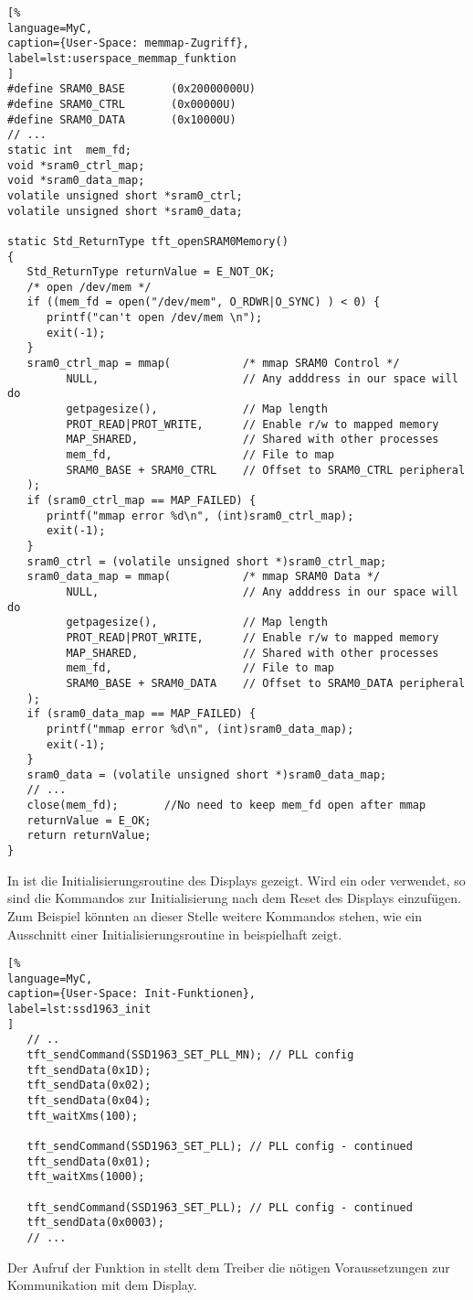 \begin{lstlisting}[%
language=MyC,
caption={User-Space: memmap-Zugriff},
label=lst:userspace_memmap_funktion
]
#define SRAM0_BASE       (0x20000000U)
#define SRAM0_CTRL       (0x00000U)
#define SRAM0_DATA       (0x10000U)
// ...
static int  mem_fd;
void *sram0_ctrl_map;
void *sram0_data_map;
volatile unsigned short *sram0_ctrl;
volatile unsigned short *sram0_data;

static Std_ReturnType tft_openSRAM0Memory()
{
   Std_ReturnType returnValue = E_NOT_OK;
   /* open /dev/mem */
   if ((mem_fd = open("/dev/mem", O_RDWR|O_SYNC) ) < 0) {
      printf("can't open /dev/mem \n");
      exit(-1);
   }
   sram0_ctrl_map = mmap(   		/* mmap SRAM0 Control */
         NULL,                		// Any adddress in our space will do
         getpagesize(),       		// Map length
         PROT_READ|PROT_WRITE,		// Enable r/w to mapped memory
         MAP_SHARED,          		// Shared with other processes
         mem_fd,             		// File to map
         SRAM0_BASE + SRAM0_CTRL    // Offset to SRAM0_CTRL peripheral
   );
   if (sram0_ctrl_map == MAP_FAILED) {
      printf("mmap error %d\n", (int)sram0_ctrl_map);
      exit(-1);
   }
   sram0_ctrl = (volatile unsigned short *)sram0_ctrl_map;
   sram0_data_map = mmap(			/* mmap SRAM0 Data */
         NULL,             			// Any adddress in our space will do
         getpagesize(),     		// Map length
         PROT_READ|PROT_WRITE,		// Enable r/w to mapped memory
         MAP_SHARED,       			// Shared with other processes
         mem_fd,           			// File to map
         SRAM0_BASE + SRAM0_DATA    // Offset to SRAM0_DATA peripheral
   );
   if (sram0_data_map == MAP_FAILED) {
      printf("mmap error %d\n", (int)sram0_data_map);
      exit(-1);
   }
   sram0_data = (volatile unsigned short *)sram0_data_map; 
   // ...
   close(mem_fd); 		//No need to keep mem_fd open after mmap
   returnValue = E_OK;
   return returnValue;
}
\end{lstlisting}

In  ist die Initialisierungsroutine  des Displays gezeigt. Wird ein  oder  verwendet, so sind die Kommandos zur Initialisierung nach dem Reset des Displays einzufügen. Zum Beispiel könnten an dieser Stelle weitere Kommandos stehen, wie ein Ausschnitt einer Initialisierungsroutine in  beispielhaft zeigt.
\begin{lstlisting}[%
language=MyC,
caption={User-Space: Init-Funktionen},
label=lst:ssd1963_init
]
   // ..      
   tft_sendCommand(SSD1963_SET_PLL_MN); // PLL config
   tft_sendData(0x1D);
   tft_sendData(0x02);
   tft_sendData(0x04);
   tft_waitXms(100);
     
   tft_sendCommand(SSD1963_SET_PLL); // PLL config - continued
   tft_sendData(0x01);
   tft_waitXms(1000);

   tft_sendCommand(SSD1963_SET_PLL); // PLL config - continued
   tft_sendData(0x0003);
   // ...
\end{lstlisting}
Der Aufruf der Funktion  in  stellt dem Treiber die nötigen Voraussetzungen zur Kommunikation mit dem Display.

